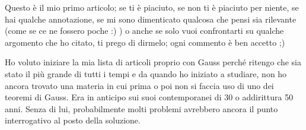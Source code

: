 Questo è il mio primo articolo; se ti è piaciuto, se non ti è piaciuto per niente, se hai qualche annotazione, se mi sono dimenticato qualcosa che pensi sia rilevante (come se ce ne fossero poche :) ) o anche se solo vuoi confrontarti su qualche argomento che ho citato, ti prego di dirmelo; ogni commento è ben accetto ;)

Ho voluto iniziare la mia lista di articoli proprio con Gauss perché ritengo che sia stato il più grande di tutti i tempi e da quando ho iniziato a studiare, non ho ancora trovato una materia in cui prima o poi non si faccia uso di uno dei teoremi di Gauss. Era in anticipo sui suoi contemporanei di 30 o addirittura 50 anni. Senza di lui, probabilmente molti problemi avrebbero ancora il punto interrogativo al posto della soluzione.





%
%
